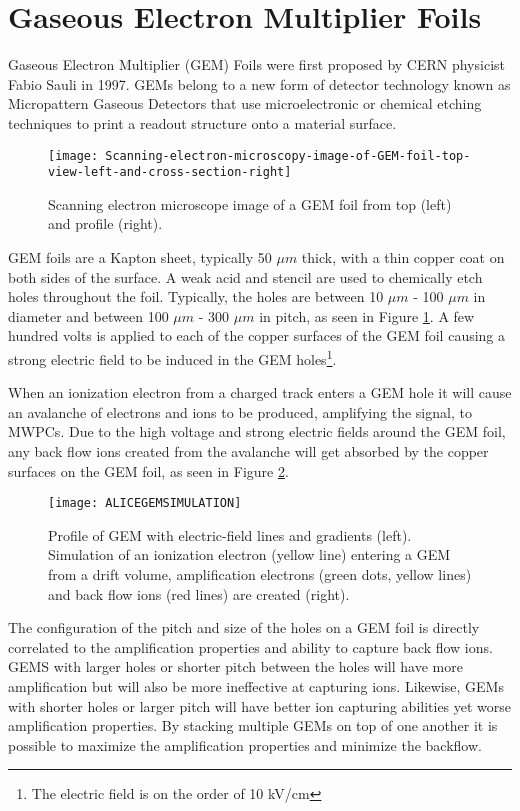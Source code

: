\section{Gaseous Electron Multiplier Foils}
Gaseous Electron Multiplier (GEM) Foils were first proposed by CERN physicist Fabio Sauli in 1997\cite{Sauli:1997qp}.  GEMs belong to a new form of detector technology known as Micropattern Gaseous Detectors\cite{Titov:2013hmq} that use microelectronic or chemical etching techniques to print a readout structure onto a material surface.

\begin{figure}[h]
\texttt{[image: Scanning-electron-microscopy-image-of-GEM-foil-top-view-left-and-cross-section-right]}
\centering
\caption{Scanning electron microscope image of a GEM foil from top (left) and profile (right)\cite{Brucken:2017qjy}.}
\label{fig:GEMpic}
\end{figure}

GEM foils are a Kapton sheet, typically 50 $\mu m$ thick, with a thin copper coat on both sides of the surface.  A weak acid and stencil are used to chemically etch holes throughout the foil.  Typically, the holes are between 10 $\mu m$ - 100 $\mu m$ in diameter and between 100 $\mu m$ - 300 $\mu m$ in pitch, as seen in Figure \ref{fig:GEMpic}.  A few hundred volts is applied to each of the copper surfaces of the GEM foil causing a strong electric field to be induced in the GEM holes\footnote{The electric field is on the order of 10 kV/cm}.  

When an ionization electron from a charged track enters a GEM hole it will cause an avalanche of electrons and ions to be produced, amplifying the signal, to MWPCs.  Due to the high voltage and strong electric fields around the GEM foil, any back flow ions created from the avalanche will get absorbed by the copper surfaces on the GEM foil, as seen in Figure \ref{fig:GEMefield}.
\begin{figure}[h]
\texttt{[image: ALICEGEMSIMULATION]}
\centering
\caption{Profile of GEM with electric-field lines and gradients (left).  Simulation of an ionization electron (yellow line) entering a GEM from a drift volume, amplification electrons (green dots, yellow lines) and back flow ions (red lines) are created (right)\cite{Bhattacharya:2017yaj}.}
\label{fig:GEMefield}
\end{figure}

The configuration of the pitch and size of the holes on a GEM foil is directly correlated to the amplification properties and ability to capture back flow ions.  GEMS with larger holes or shorter pitch between the holes will have more amplification but will also be more ineffective at capturing ions.  Likewise, GEMs with shorter holes or larger pitch will have better ion capturing abilities yet worse amplification properties.  By stacking multiple GEMs on top of one another it is possible to maximize the amplification properties and minimize the backflow. 

